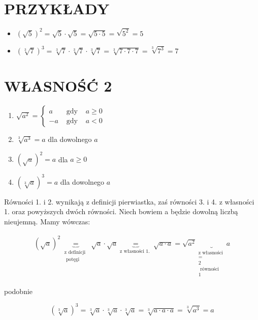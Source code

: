 \documentclass[10pt]{article}
\begin{document}
\section*{PRZYKŁADY}
\begin{itemize}
  \item \((\sqrt{5})^{2}=\sqrt{5} \cdot \sqrt{5}=\sqrt{5 \cdot 5}=\sqrt{5^{2}}=5\)
  \item \((\sqrt[3]{7})^{3}=\sqrt[3]{7} \cdot \sqrt[3]{7} \cdot \sqrt[3]{7}=\sqrt[3]{7 \cdot 7 \cdot 7}=\sqrt[3]{7^{3}}=7\)
\end{itemize}

\section*{WŁASNOŚĆ 2}
\begin{enumerate}
  \item \(\sqrt{a^{2}}=\left\{\begin{array}{rrr}a & \text { gdy } & a \geqslant 0 \\ -a & \text { gdy } & a<0\end{array}\right.\)
  \item \(\sqrt[3]{a^{3}}=a\) dla dowolnego \(a\)
  \item \((\sqrt{a})^{2}=a\) dla \(a \geqslant 0\)
  \item \((\sqrt[3]{a})^{3}=a\) dla dowolnego \(a\)
\end{enumerate}

Równości 1. i 2. wynikają z definicji pierwiastka, zaś równości 3. i 4. z własności 1. oraz powyższych dwóch równości. Niech bowiem a będzie dowolną liczbą nieujemną. Mamy wówczas:

\[
\begin{gathered}
(\sqrt{a})^{2} \underbrace{=}_{\substack{\mathrm{z} \text { definicji } \\
\text { potęgi }}} \sqrt{a} \cdot \sqrt{a} \underbrace{=}_{\mathrm{z} \text { własności 1. }} \sqrt{a \cdot a}=\sqrt{a^{2}} \underbrace{}_{\begin{array}{c}
\mathrm{z} \text { własności } \\
= \\
2 \\
\text { równości } \\
1
\end{array}} a
\end{gathered}
\]

podobnie

\[
(\sqrt[3]{a})^{3}=\sqrt[3]{a} \cdot \sqrt[3]{a} \cdot \sqrt[3]{a}=\sqrt[3]{a \cdot a \cdot a}=\sqrt[3]{a^{3}}=a
\]
\end{document}
